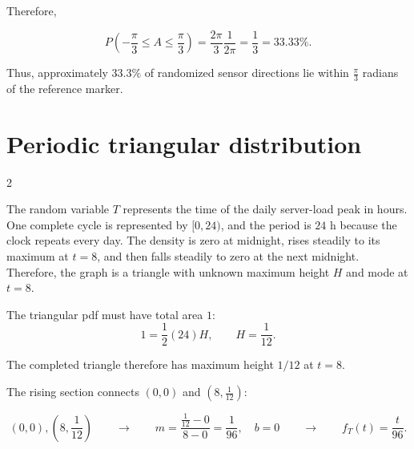 	Therefore,
	
	$$
	P\left(-\frac{\pi}{3}\le A\le\frac{\pi}{3}\right)
	=
	\frac{2\pi}{3}\frac1{2\pi}
	=
	\frac13
	=
	33.33\%.
	$$
	
	Thus, approximately $33.3\%$ of randomized sensor directions lie within
	$\frac{\pi}{3}$ radians of the reference marker.
	
	
	
	\section{Periodic triangular distribution}
	
	\setlength{\columnseprule}{0.4pt}
	\begin{multicols}{2}
		
		The random variable $T$ represents the time of the daily server-load
		peak in hours. One complete cycle is represented by $[0,24)$, and the
		period is $24$ h because the clock repeats every day. The density is
		zero at midnight, rises steadily to its maximum at $t=8$, and then
		falls steadily to zero at the next midnight. Therefore, the graph is
		a triangle with unknown maximum height $H$ and mode at $t=8$.
		
		
		\columnbreak
		
		The triangular pdf must have total area $1$:
		\[
		1=\frac12(24)H,
		\qquad
		H=\frac1{12}.
		\]
		
		The completed triangle therefore has maximum height $1/12$ at $t=8$.
		

		
	\end{multicols}
	\setlength{\columnseprule}{0pt}
	
	The rising section connects $(0,0)$ and
	$\left(8,\frac1{12}\right)$:
	
	$$
	(0,0),\left(8,\frac1{12}\right)
	\qquad\longrightarrow\qquad
	m=\frac{\frac1{12}-0}{8-0}
	=\frac1{96},
	\quad b=0
	\qquad\longrightarrow\qquad
	f_T(t)=\frac{t}{96}.
	$$
	
